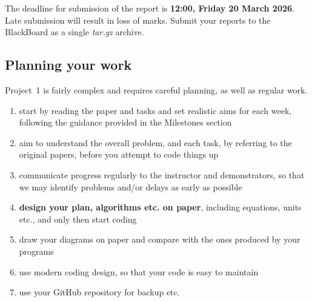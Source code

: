 \documentclass[11pt,a4paper]{article}
\begin{document}
The deadline for submission of the report is {\bf 12:00, Friday 20 March 2026}.  Late submission will result in loss of marks.  Submit your reports to the BlackBoard as a single \emph{tar.gz} archive.

\pagebreak
\subsection*{Planning your work}
Project~1 is fairly complex and requires careful planning, as well as regular work.

\begin{enumerate}
	\item start by reading the paper and tasks and set realistic aims for each week, following the guidance provided in the Milestones section
	\item aim to understand the overall problem, and each task, by referring to the original papers, before you attempt to code things up
	\item communicate progress regularly to the instructor and demonstrators, so that we may identify problems and/or delays as early as possible
	\item {\bf design your plan, algorithms etc. on paper}, including equations, units etc., and only then start coding
	\item draw your diagrams on paper and compare with the ones produced by your programs
	\item use modern coding design, so that your code is easy to maintain
	\item use your GitHub repository for backup etc.
\end{enumerate}	

\vspace{-1cm}


\end{document}
